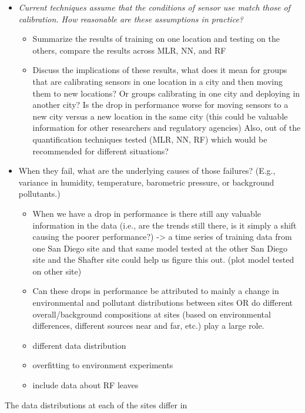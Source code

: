 \documentclass[journal abbreviation, manuscript]{copernicus}
\begin{document}
\begin{itemize}
    \item  \emph{Current techniques assume that the conditions of sensor use match those of calibration.  How reasonable are these assumptions in practice?}
    \begin{itemize}
        \item Summarize the results of training on one location and testing on the others, compare the results across MLR, NN, and RF 
        \item Discuss the implications of these results, what does it mean for groups that are calibrating sensors in one location in a city and then moving them to new locations? Or groups calibrating in one city and deploying in another city? Is the drop in performance worse for moving sensors to a new city versus a new location in the same city (this could be valuable information for other researchers and regulatory agencies) Also, out of the quantification techniques tested (MLR, NN, RF) which would be recommended for different situations?
    \end{itemize}
    \item When they fail, what are the underlying causes of those failures?  (E.g., variance in humidity, temperature, barometric pressure, or background pollutants.)
    \begin{itemize}
        \item When we have a drop in performance is there still any valuable information in the data (i.e., are the trends still there, is it simply a shift causing the poorer performance?) -> a time series of training data from one San Diego site and that same model tested at the other San Diego site and the Shafter site could help us figure this out. (plot model tested on other site)
        \item Can these drops in performance be attributed to mainly a change in environmental and pollutant distributions between sites OR do different overall/background compositions at sites (based on environmental differences, different sources near and far, etc.) play a large role.
        \item different data distribution
        \item overfitting to environment experiments
        \item include data about RF leaves
    \end{itemize}
\end{itemize}

The data distributions at each of the sites differ in 
\end{document}
